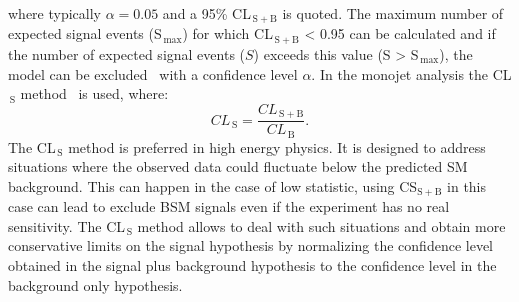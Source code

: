 where typically $\alpha = 0.05$ and a 95\% CL$_\mathrm{\, S+B}$ is quoted. The
maximum number of expected signal events (S$_\mathrm{\, max}$) for which
CL$_\mathrm{\, S+B}$ < 0.95 can be calculated and if the number of expected
signal events ($S$) exceeds this value (S > S$_\mathrm{\, max}$), the model can
be excluded~\cite{PawelThesis} with a confidence level $\alpha$. In the monojet
analysis the CL$_\mathrm{\, S}$ method~\cite{CLsMethod} is used, where:
\begin{equation}
  \label{eq:89}
  CL_\mathrm{\, S} = \frac{CL_\mathrm{\, S+B}}{CL_\mathrm{\, B}}.
\end{equation}
The CL$_\mathrm{\, S}$ method is preferred in high energy physics. It is
designed to address situations where the observed data could fluctuate below the
predicted SM background. This can happen in the case of low statistic, using
CS$_\mathrm{S + B}$ in this case can lead to exclude BSM signals even if the
experiment has no real sensitivity. The CL$_\mathrm{\, S}$ method allows to deal
with such situations and obtain more conservative limits on the signal
hypothesis by normalizing the confidence level obtained in the signal plus
background hypothesis to the confidence level in the background only
hypothesis.
